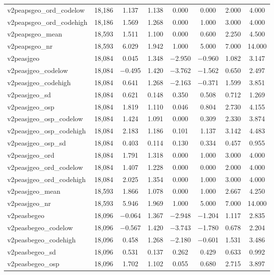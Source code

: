 \begin{table}[!htbp]
\begin{tabular}{@{\extracolsep{5pt}}lccccccc}
v2peapsgeo\_ord\_codelow & 18,186 & 1.137 & 1.138 & 0.000 & 0.000 & 2.000 & 4.000 \\ 
v2peapsgeo\_ord\_codehigh & 18,186 & 1.569 & 1.268 & 0.000 & 1.000 & 3.000 & 4.000 \\ 
v2peapsgeo\_mean & 18,593 & 1.511 & 1.100 & 0.000 & 0.600 & 2.250 & 4.500 \\ 
v2peapsgeo\_nr & 18,593 & 6.029 & 1.942 & 1.000 & 5.000 & 7.000 & 14.000 \\ 
v2peasjgeo & 18,084 & 0.045 & 1.348 & $-$2.950 & $-$0.960 & 1.082 & 3.147 \\ 
v2peasjgeo\_codelow & 18,084 & $-$0.495 & 1.420 & $-$3.762 & $-$1.562 & 0.650 & 2.497 \\ 
v2peasjgeo\_codehigh & 18,084 & 0.641 & 1.268 & $-$2.163 & $-$0.371 & 1.599 & 3.851 \\ 
v2peasjgeo\_sd & 18,084 & 0.621 & 0.148 & 0.350 & 0.508 & 0.712 & 1.269 \\ 
v2peasjgeo\_osp & 18,084 & 1.819 & 1.110 & 0.046 & 0.804 & 2.730 & 4.155 \\ 
v2peasjgeo\_osp\_codelow & 18,084 & 1.424 & 1.091 & 0.000 & 0.309 & 2.330 & 3.874 \\ 
v2peasjgeo\_osp\_codehigh & 18,084 & 2.183 & 1.186 & 0.101 & 1.137 & 3.142 & 4.483 \\ 
v2peasjgeo\_osp\_sd & 18,084 & 0.403 & 0.114 & 0.130 & 0.334 & 0.457 & 0.955 \\ 
v2peasjgeo\_ord & 18,084 & 1.791 & 1.318 & 0.000 & 1.000 & 3.000 & 4.000 \\ 
v2peasjgeo\_ord\_codelow & 18,084 & 1.407 & 1.228 & 0.000 & 0.000 & 2.000 & 4.000 \\ 
v2peasjgeo\_ord\_codehigh & 18,084 & 2.025 & 1.354 & 0.000 & 1.000 & 3.000 & 4.000 \\ 
v2peasjgeo\_mean & 18,593 & 1.866 & 1.078 & 0.000 & 1.000 & 2.667 & 4.250 \\ 
v2peasjgeo\_nr & 18,593 & 5.946 & 1.969 & 1.000 & 5.000 & 7.000 & 14.000 \\ 
v2peasbegeo & 18,096 & $-$0.064 & 1.367 & $-$2.948 & $-$1.204 & 1.117 & 2.835 \\ 
v2peasbegeo\_codelow & 18,096 & $-$0.567 & 1.420 & $-$3.743 & $-$1.780 & 0.678 & 2.204 \\ 
v2peasbegeo\_codehigh & 18,096 & 0.458 & 1.268 & $-$2.180 & $-$0.601 & 1.531 & 3.486 \\ 
v2peasbegeo\_sd & 18,096 & 0.531 & 0.137 & 0.262 & 0.429 & 0.633 & 0.992 \\ 
v2peasbegeo\_osp & 18,096 & 1.702 & 1.102 & 0.055 & 0.680 & 2.715 & 3.897 \\ 

\end{tabular}
\end{table}
